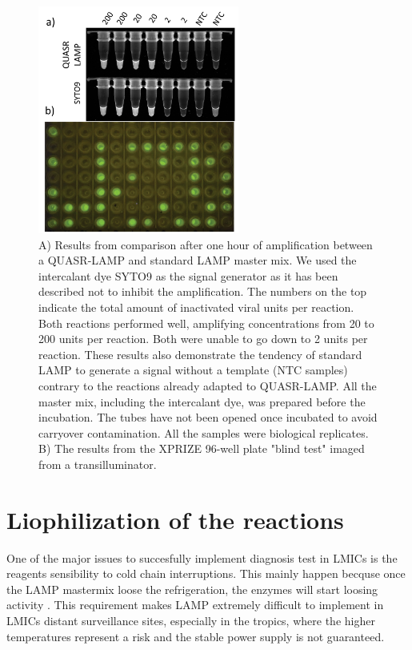 \begin{figure}[b]
    \centering
    \includegraphics[width=0.59\textwidth]{figures/LAMP2.png}
    \caption{ A) Results from comparison after one hour of amplification between a QUASR-LAMP and standard LAMP master mix. We used the intercalant dye SYTO9 as the signal generator as it has been described not to inhibit the amplification\cite{oscorbin_comparison_2016}. The numbers on the top indicate the total amount of inactivated viral units per reaction. Both reactions performed well, amplifying concentrations from 20 to 200 units per reaction. Both were unable to go down to 2 units per reaction. These results also demonstrate the tendency of standard LAMP to generate a signal without a template (NTC samples) contrary to the reactions already adapted to QUASR-LAMP. All the master mix, including the intercalant dye, was prepared before the incubation. The tubes have not been opened once incubated to avoid carryover contamination. All the samples were biological replicates. B) The results from the XPRIZE 96-well plate "blind test" imaged from a transilluminator.}
    \label{fig:LAMP2}
\end{figure}

\section{Liophilization of the reactions}
One of the major issues to succesfully implement diagnosis test in LMICs is the reagents sensibility to cold chain interruptions. This mainly happen becquse once the LAMP mastermix loose the refrigeration, the enzymes will start loosing activity . This requirement makes LAMP extremely difficult to implement in LMICs distant surveillance sites, especially in the tropics, where the higher temperatures represent a risk and the stable power supply is not guaranteed.

